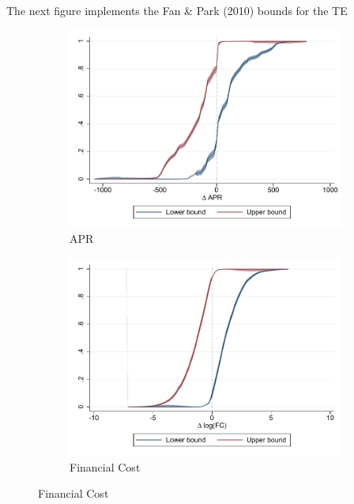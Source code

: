 \documentclass[oneside,11pt]{article}
\begin{document}
The next figure implements the  Fan \& Park (2010) bounds for the TE


\begin{figure}[H]
    \caption{}
    \label{}
    \begin{center}

    \begin{subfigure}{0.475\textwidth}
        \caption{APR}
        \centering
        \includegraphics[width=\textwidth]{Figuras/fan_park_bounds_apr.pdf}
    \end{subfigure}
    \begin{subfigure}{0.475\textwidth}
        \caption{Financial Cost}
        \centering
        \includegraphics[width=\textwidth]{Figuras/fan_park_bounds_fc_admin.pdf}
    \end{subfigure}

\end{center}
\end{figure}
\end{document}
